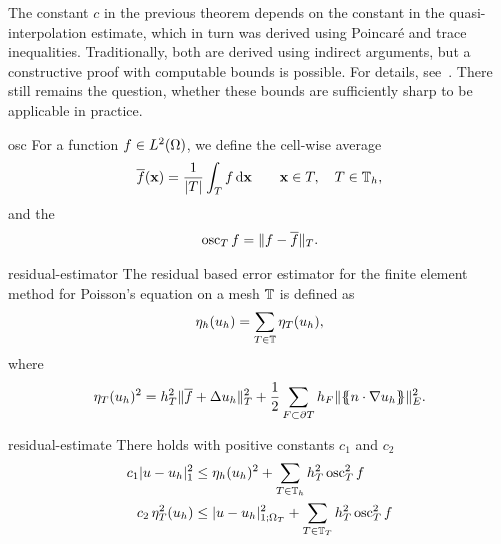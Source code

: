 \begin{remark}
  The constant $c$ in the previous theorem depends on the constant in
  the quasi-interpolation estimate, which in turn was derived using
  Poincaré and trace inequalities. Traditionally, both are derived
  using indirect arguments, but a constructive proof with computable
  bounds is possible. For details, see~\cite[Chapter
  3]{Verfuerth13}. There still remains the question, whether these
  bounds are sufficiently sharp to be applicable in practice.
\end{remark}

\begin{Definition}{osc}
  For a function $f\in L^2(\Omega)$, we define the cell-wise average
  \begin{gather}
    \overline f(\mathbf x) = \frac1{\lvert T\rvert}\int_T f \,\mathrm{d} \mathbf x
    \qquad\mathbf x\in T, \quad T\in\mathbb T_h,
  \end{gather}
  and the 
  \begin{gather}
    \operatorname{osc}_T f = \lVert f-\overline f\rVert_T.
  \end{gather}
\end{Definition}

\begin{Definition}{residual-estimator}
  The residual based error estimator for the finite element method for
  Poisson's equation on a mesh $\mathbb T$ is defined as
  \begin{gather}
    \eta_{h}(u_h) = \sum_{T\in\mathbb T} \eta_{T}(u_h),
  \end{gather}
  where
  \begin{gather}
    \eta_{T}(u_h)^2 = h_{T}^2 \lVert\overline f + \Delta u_h\rVert_T^2
    + \frac12 \sum_{F\subset \partial T} h_F\lVert\{\!\!\{n\cdot\nabla u_h\}\!\!\}\rVert_E^2.
  \end{gather}
\end{Definition}

\begin{Theorem}{residual-estimate}
  There holds with positive constants $c_1$ and $c_2$
  \begin{align}
    \label{eq:fem-aposteriori:6}
    c_1 \lvert u-u_h\rvert_1^2
    &\le \eta_{h}(u_h)^2
      + \sum_{T\in\mathbb T_h} h^2_T\operatorname{osc}_T^2 f
    \\
    \label{eq:fem-aposteriori:7}
    c_2 \,\eta_T^2(u_h)
    &\le \lvert u-u_h\rvert_{1;\Omega_{T}}^2
      + \sum_{T\in\mathbb T_T} h^2_T\operatorname{osc}_T^2 f
  \end{align}
\end{Theorem}

